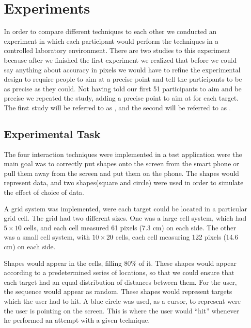 \section{Experiments} \label{sec:experiment}
In order to compare  different techniques to each other we conducted an experiment in which each participant would perform the techniques in a controlled laboratory environment.
There are two studies to this experiment because after we finished the first experiment we realized that before we could say anything about accuracy in pixels we would have to refine the experimental design to require people to aim at a precise point and tell the participants to be as precise as they could.
Not having told our first 51 participants to aim and be precise we repeated the study, adding a precise point to aim at for each target.
The first  study will be referred to as \target, and the second will be referred to as \accuracy.

\subsection{Experimental Task}
The four interaction techniques were implemented in a test application were the main goal was to correctly put shapes onto the screen from the smart phone or pull them away from the screen and put them on the phone.
The shapes would represent data, and two shapes(square and circle) were used in order to simulate the effect of choice of data. 

A grid system was implemented, were each target could be located in a particular grid cell.
The grid had two different sizes.
One was a large cell system, which had $5\times10$ cells, and each cell measured 61 pixels (7.3 cm) on each side.
The other was a small cell system, with $10\times20$ cells, each cell measuring 122 pixels (14.6 cm)  on each side. 

Shapes would appear in the cells, filling 80\% of it. 
These shapes would appear according to a predetermined series of locations, so that we could ensure that each target had an equal distribution of distances between them. 
For the user, the sequence would appear as random. 
These shapes would represent targets which the user had to hit.
A blue circle was used, as a cursor, to represent were the user is pointing on the screen.
This is where the user would ``hit'' whenever he performed an attempt with a given technique.

